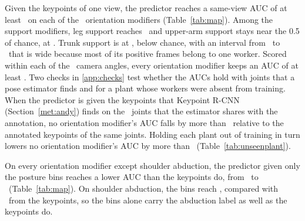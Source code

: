\documentclass[review,3p,authoryear]{elsarticle}
\begin{document}
Given the keypoints of one view, the predictor reaches a same-view AUC of at least
\orientMinAuc\ on each of the \nOrientModifiers\ orientation modifiers
(Table~\ref{tab:map}). Among the support modifiers, leg support reaches \aucLegsSupport\
and upper-arm support stays near the 0.5 of chance, at \aucUpperarmSupport. Trunk support
is at \aucTrunkSupport, below chance, with an interval from \aucCiLoTrunkSupport\ to
\aucCiHiTrunkSupport\ that is wide because most of its positive frames belong to one
worker. Scored within each of the \nAngles\ camera angles, every orientation modifier keeps
an AUC of at least \minOrientAucOverAngles. Two checks in \ref{app:checks} test whether the
AUCs hold with joints that a pose estimator finds and for a plant whose workers were absent from training. When the predictor is given the keypoints that Keypoint R-CNN
(Section~\ref{met:andy}) finds on the \nJointsEst\ joints that the estimator shares with
the annotation, no orientation modifier's AUC falls by more than \poseMaxOrientDropAuc\
relative to the annotated keypoints of the same joints. Holding each plant out of training in turn lowers no
orientation modifier's AUC by more than \siteMaxOrientDropAuc\ (Table~\ref{tab:unseenplant}).

On every orientation modifier except shoulder abduction, the predictor given only the
posture bins reaches a lower AUC than the keypoints do, from \ablBinsOrientLo\ to
\ablBinsOrientHi\ (Table~\ref{tab:map}). On shoulder abduction, the bins reach
\ablBinsUpperarmAbduct, compared with \aucUpperarmAbduct\ from the keypoints, so the bins
alone carry the abduction label as well as the keypoints do.
\end{document}
